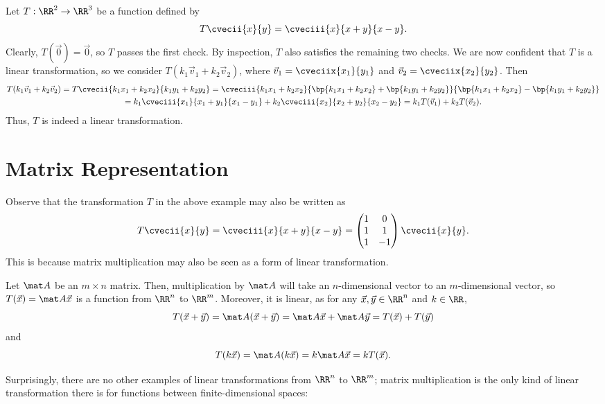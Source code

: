 \begin{example}
    Let $T: \RR^2 \to \RR^3$ be a function defined by \[T\cvecii{x}{y} = \cveciii{x}{x+y}{x-y}.\] Clearly, $T(\vec 0) = \vec 0$, so $T$ passes the first check. By inspection, $T$ also satisfies the remaining two checks. We are now confident that $T$ is a linear transformation, so we consider $T(k_1 \vec v_1 + k_2 \vec v_2)$, where $\vec v_1 = \cveciix{x_1}{y_1}$ and $\vec v_2 = \cveciix{x_2}{y_2}$. Then
    \begin{gather*}
        T(k_1 \vec v_1 + k_2 \vec v_2) = T\cvecii{k_1 x_1 + k_2 x_2}{k_1 y_1 + k_2 y_2} = \cveciii{k_1 x_1 + k_2 x_2}{\bp{k_1 x_1 + k_2 x_2} + \bp{k_1 y_1 + k_2 y_2}}{\bp{k_1 x_1 + k_2 x_2} - \bp{k_1 y_1 + k_2 y_2}}\\
        = k_1\cveciii{x_1}{x_1 + y_1}{x_1 - y_1} + k_2 \cveciii{x_2}{x_2 + y_2}{x_2 - y_2} = k_1 T(\vec v_1) + k_2 T(\vec v_2).
    \end{gather*}
    Thus, $T$ is indeed a linear transformation.
\end{example}

\section{Matrix Representation}

Observe that the transformation $T$ in the above example may also be written as \[T\cvecii{x}{y} = \cveciii{x}{x+y}{x-y} = \begin{pmatrix}1 & 0 \\ 1 & 1 \\ 1 & -1\end{pmatrix} \cvecii{x}{y}.\] This is because matrix multiplication may also be seen as a form of linear transformation.

\begin{proposition}
    Let $\mat A$ be an $m \times n$ matrix. Then, multiplication by $\mat A$ will take an $n$-dimensional vector to an $m$-dimensional vector, so $T(\vec x) = \mat A \vec x$ is a function from $\RR^n$ to $\RR^m$. Moreover, it is linear, as for any $\vec x, \vec y \in \RR^n$ and $k \in \RR$, \[T(\vec x + \vec y) = \mat A (\vec x + \vec y) = \mat A \vec x + \mat A \vec y = T(\vec x) + T(\vec y)\] and \[T(k\vec x) = \mat A (k \vec x) = k \mat A \vec x = k T(\vec x).\]
\end{proposition}

Surprisingly, there are no other examples of linear transformations from $\RR^n$ to $\RR^m$; matrix multiplication is the only kind of linear transformation there is for functions between finite-dimensional spaces:

